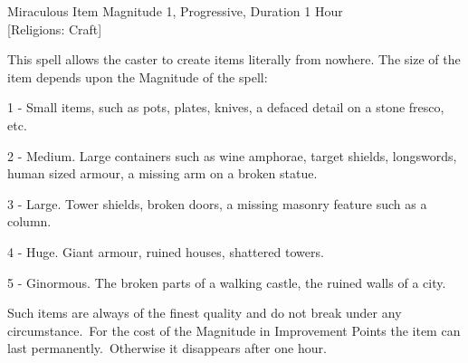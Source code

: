 \begin{samepage}
\begin{rpg-spell}
{Miraculous Item}
{Magnitude 1, Progressive, Duration 1 Hour\\{[Religions: Craft]}}

This spell allows the caster to create items literally from nowhere. The size of the item depends upon the Magnitude of the spell:
\begin{rpg-list}
\item 1 - Small items, such as pots, plates, knives, a defaced detail on a stone fresco, etc.
\item 2 - Medium. Large containers such as wine amphorae, target shields, longswords, human sized armour, a missing arm on a broken statue.
\item 3 - Large. Tower shields, broken doors, a missing masonry feature such as a column.
\item 4 - Huge. Giant armour, ruined houses, shattered towers.
\item 5 - Ginormous. The broken parts of a walking castle, the ruined walls of a city.
\end{rpg-list}
Such items are always of the finest quality and do not break under any circumstance. For the cost of the Magnitude in Improvement Points the item can last permanently. Otherwise it disappears after one hour.
\end{rpg-spell}
\end{samepage}


